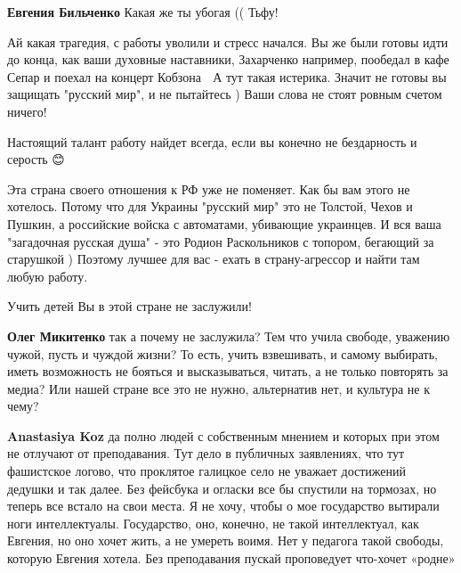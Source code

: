 \begin{itemize}
\begin{itemize}
\textbf{Евгения Бильченко} Какая же ты убогая (( Тьфу!
\end{itemize}

 

Ай какая трагедия, с работы уволили и стресс начался. Вы же были готовы идти до
конца, как ваши духовные наставники, Захарченко например, пообедал в кафе Сепар
и поехал на концерт Кобзона 🤣 А тут такая истерика. Значит не готовы вы
защищать "русский мир", и не пытайтесь ) Ваши слова не стоят ровным счетом
ничего!

Настоящий талант работу найдет всегда, если вы конечно не бездарность и серость
😊

Эта страна своего отношения к РФ уже не поменяет. Как бы вам этого не хотелось.
Потому что для Украины "русский мир" это не Толстой, Чехов и Пушкин, а
российские войска с автоматами, убивающие украинцев. И вся ваша "загадочная
русская душа" - это Родион Раскольников с топором, бегающий за старушкой )
Поэтому лучшее для вас - ехать в страну-агрессор и найти там любую работу.

Учить детей Вы в этой стране не заслужили!

\begin{itemize}
 
\textbf{Олег Микитенко} так а почему не заслужила? Тем что учила свободе, уважению чужой, пусть и чуждой жизни? То есть, учить взвешивать, и самому выбирать, иметь возможность не бояться и высказываться, читать, а не только повторять за медиа? Или нашей стране все это не нужно, альтернатив нет, и культура не к чему?

 
\textbf{Anastasiya Koz} да полно людей с собственным мнением и которых при этом не отлучают от преподавания. Тут дело в публичных заявлениях, что тут фашистское логово, что проклятое галицкое село не уважает достижений дедушки и так далее. Без фейсбука и огласки все бы спустили на тормозах, но теперь все встало на свои места. Я не хочу, чтобы о мое государство вытирали ноги интеллектуалы. Государство, оно, конечно, не такой интеллектуал, как Евгения, но оно хочет жить, а не умереть воимя. Нет у педагога такой свободы, которую Евгения хотела. Без преподавания пускай проповедует что-хочет «родне»


\end{itemize}
\end{itemize}
